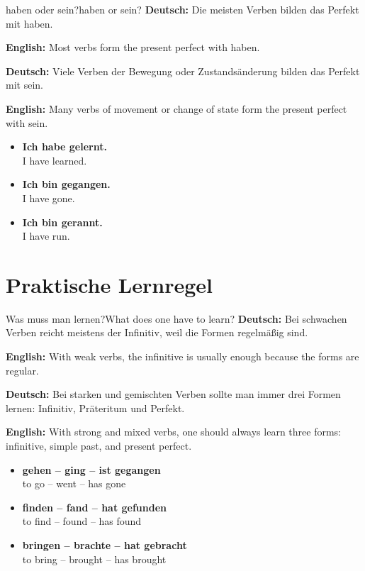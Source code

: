\documentclass[a4paper,11pt]{article}
\newcommand{\GermanText}[1]{\textbf{Deutsch: }#1\par}
\newcommand{\EnglishText}[1]{{\small\color{SoftGray}\textbf{English: }#1\par}}
\newcommand{\ExampleItem}[2]{\item \textbf{#1}\\{\small\color{SoftGray}#2}}
\begin{document}
        \begin{grammarentry}{haben oder sein?}{haben or sein?}
            \GermanText{Die meisten Verben bilden das Perfekt mit haben.}
            \EnglishText{Most verbs form the present perfect with haben.}
            
            \GermanText{Viele Verben der Bewegung oder Zustandsänderung bilden das Perfekt mit sein.}
            \EnglishText{Many verbs of movement or change of state form the present perfect with sein.}
            
            \begin{exbox}
                \begin{itemize}
                    \ExampleItem{Ich habe gelernt.}{I have learned.}
                    \ExampleItem{Ich bin gegangen.}{I have gone.}
                    \ExampleItem{Ich bin gerannt.}{I have run.}
                \end{itemize}
            \end{exbox}
        \end{grammarentry}
    
    
    \section{Praktische Lernregel}
        
        \begin{grammarentry}{Was muss man lernen?}{What does one have to learn?}
            \GermanText{Bei schwachen Verben reicht meistens der Infinitiv, weil die Formen regelmäßig sind.}
            \EnglishText{With weak verbs, the infinitive is usually enough because the forms are regular.}
            
            \GermanText{Bei starken und gemischten Verben sollte man immer drei Formen lernen: Infinitiv, Präteritum und Perfekt.}
            \EnglishText{With strong and mixed verbs, one should always learn three forms: infinitive, simple past, and present perfect.}
            
            \begin{exbox}
                \begin{itemize}
                    \ExampleItem{gehen -- ging -- ist gegangen}{to go -- went -- has gone}
                    \ExampleItem{finden -- fand -- hat gefunden}{to find -- found -- has found}
                    \ExampleItem{bringen -- brachte -- hat gebracht}{to bring -- brought -- has brought}
                \end{itemize}
            \end{exbox}
        \end{grammarentry}
    
\end{document}
